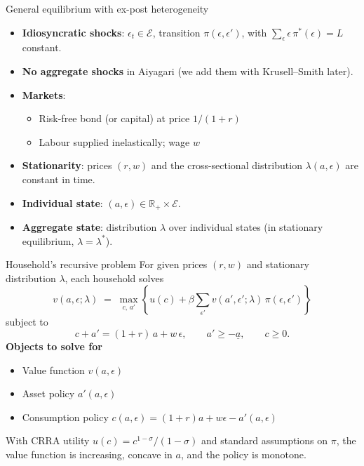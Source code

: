 \documentclass[10pt,english,aspectratio=169]{beamer}
\begin{document}
\begin{frame}{General equilibrium with ex-post heterogeneity}
\begin{itemize}
\item \textbf{Idiosyncratic shocks}: $\epsilon_t \in \mathcal{E}$, transition $\pi(\epsilon,\epsilon')$, with $\sum_{\epsilon}\epsilon\,\pi^*(\epsilon)=L$ constant.
\item \textbf{No aggregate shocks} in Aiyagari (we add them with Krusell--Smith later).
\item \textbf{Markets}:
  \begin{itemize}
  \item Risk-free bond (or capital) at price $1/(1+r)$
  \item Labour supplied inelastically; wage $w$
  \end{itemize}
\item \textbf{Stationarity}: prices $(r,w)$ and the cross-sectional distribution $\lambda(a,\epsilon)$ are constant in time.
\item \textbf{Individual state}: $(a,\epsilon) \in \mathbb{R}_+ \times \mathcal{E}$.
\item \textbf{Aggregate state}: distribution $\lambda$ over individual states (in stationary equilibrium, $\lambda=\lambda^*$).
\end{itemize}
\end{frame}

\begin{frame}{Household's recursive problem}
For given prices $(r,w)$ and stationary distribution $\lambda$, each household solves
\[
v(a,\epsilon;\lambda) \;=\; \max_{c,\,a'}\!\left\{u(c) + \beta \sum_{\epsilon'} v(a',\epsilon';\lambda)\,\pi(\epsilon,\epsilon')\right\}
\]
subject to
\[
c + a' = (1+r)\,a + w\,\epsilon, \qquad a' \geq -\underline{a}, \qquad c \geq 0.
\]
\medskip
\textbf{Objects to solve for}
\begin{itemize}
\item Value function $v(a,\epsilon)$
\item Asset policy $a'(a,\epsilon)$
\item Consumption policy $c(a,\epsilon) = (1+r)a + w\epsilon - a'(a,\epsilon)$
\end{itemize}
\medskip
With CRRA utility $u(c)=c^{1-\sigma}/(1-\sigma)$ and standard assumptions on $\pi$, the value function is increasing, concave in $a$, and the policy is monotone.
\end{frame}
\end{document}
